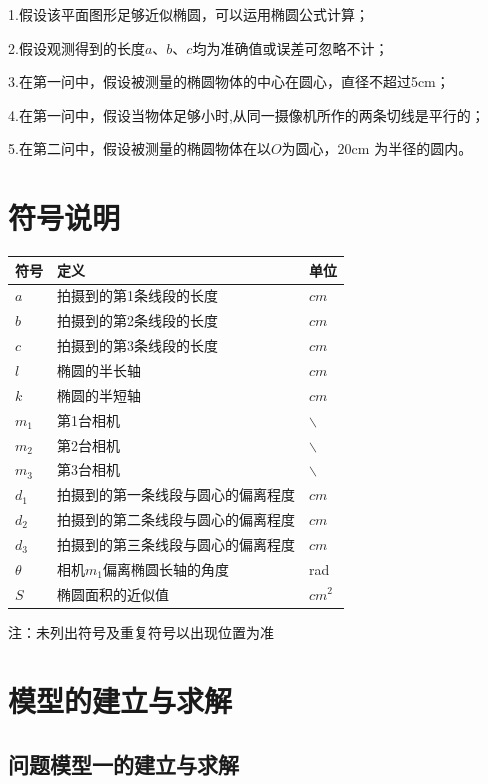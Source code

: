 \documentclass[a4paper,10.5pt]{ctexart}
\begin{document}
\par 1.假设该平面图形足够近似椭圆，可以运用椭圆公式计算；

2.假设观测得到的长度$a$、$b$、$c$均为准确值或误差可忽略不计；

3.在第一问中，假设被测量的椭圆物体的中心在圆心，直径不超过5cm；

4.在第一问中，假设当物体足够小时,从同一摄像机所作的两条切线是平行的；

5.在第二问中，假设被测量的椭圆物体在以$O$为圆心，$20$cm 为半径的圆内。
\section{符号说明}
\begin{table}[h]
\centering
\begin{tabular}{C{2cm}C{12cm}C{2cm}}
\toprule[2pt]
\textbf {符号}&\textbf {定义}&\textbf {单位}\\\midrule[1pt]
$a$ & 拍摄到的第1条线段的长度  & $cm$ \\
$b$ & 拍摄到的第2条线段的长度& $cm$\\
$c$ & 拍摄到的第3条线段的长度& $cm$\\
$l$ & 椭圆的半长轴 &$cm$ \\
$k$ & 椭圆的半短轴 &$cm$ \\
$m_1$ & 第1台相机& $\backslash$\\
$m_2$ & 第2台相机& $\backslash$\\
$m_3$ & 第3台相机& $\backslash$\\
$d_1$ & 拍摄到的第一条线段与圆心的偏离程度& $cm$\\
$d_2$ & 拍摄到的第二条线段与圆心的偏离程度& $cm$\\
$d_3$ & 拍摄到的第三条线段与圆心的偏离程度& $cm$\\
$\theta$  & 相机$m_1$偏离椭圆长轴的角度 & rad\\
$S$ & 椭圆面积的近似值 & $cm^2$ \\
\bottomrule[2pt]
\end{tabular}
\label{tab:wei1}
\end{table}
注：未列出符号及重复符号以出现位置为准
\section{模型的建立与求解}
\subsection{问题模型一的建立与求解}
\end{document}
